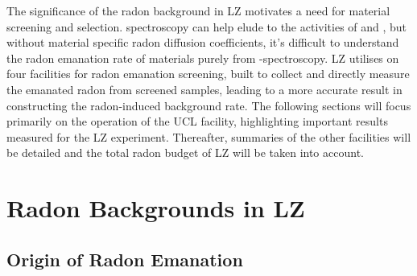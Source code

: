 The significance of the radon background in LZ motivates a need for material screening and selection. \gray spectroscopy can help elude to the activities of \UandTe{} and \UandTl{}, but without material specific radon diffusion coefficients, it's difficult to understand the radon emanation rate of materials purely from \gamma-spectroscopy. LZ utilises on four facilities for radon emanation screening, built to collect and directly measure the emanated radon from screened samples, leading to a more accurate result in constructing the radon-induced background rate. The following sections will focus primarily on the operation of the UCL facility, highlighting important results measured for the LZ experiment. Thereafter, summaries of the other facilities will be detailed and the total radon budget of LZ will be taken into account. 

\section{Radon Backgrounds in LZ}
\label{sec:radon_and_lz}

\subsection{Origin of Radon Emanation}
\label{secsec:radon_origins}

